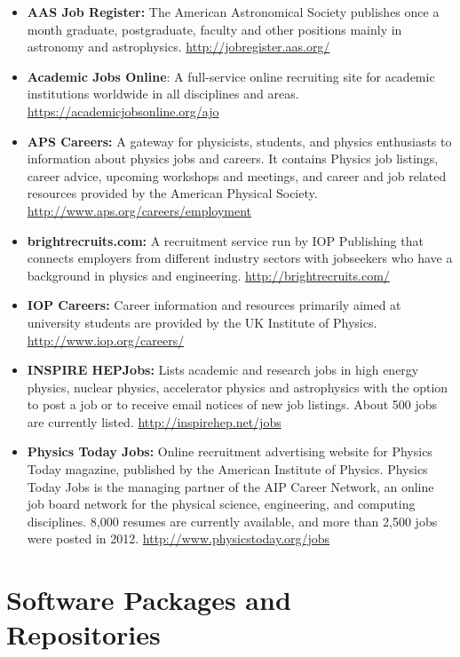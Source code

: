 \begin{itemize}
\item
  \textbf{AAS Job Register:} The American Astronomical Society publishes
  once a month graduate, postgraduate, faculty and other positions
  mainly in astronomy and astrophysics.
  \url{http://jobregister.aas.org/}
\item
  \textbf{Academic Jobs Online}: A full-service online recruiting site
  for academic institutions worldwide in all disciplines and areas.
  \url{https://academicjobsonline.org/ajo}
\item
  \textbf{APS Careers:} A gateway for physicists, students, and physics
  enthusiasts to information about physics jobs and careers. It contains
  Physics job listings, career advice, upcoming workshops and meetings,
  and career and job related resources provided by the American Physical
  Society. \url{http://www.aps.org/careers/employment}
\item
  \textbf{brightrecruits.com:} A recruitment service run by IOP
  Publishing that connects employers from different industry sectors
  with jobseekers who have a background in physics and engineering.
  \url{http://brightrecruits.com/}
\item
  \textbf{IOP Careers:} Career information and resources primarily aimed
  at university students are provided by the UK Institute of Physics.
  \url{http://www.iop.org/careers/}
\item
  \textbf{INSPIRE HEPJobs:} Lists academic and research jobs in high
  energy physics, nuclear physics, accelerator physics and astrophysics
  with the option to post a job or to receive email notices of new job
  listings. About 500 jobs are currently listed.
  \url{http://inspirehep.net/jobs}
\item
  \textbf{Physics Today Jobs:} Online recruitment advertising website
  for Physics Today magazine, published by the American Institute of
  Physics. Physics Today Jobs is the managing partner of the AIP Career
  Network, an online job board network for the physical science,
  engineering, and computing disciplines. 8,000 resumes are currently
  available, and more than 2,500 jobs were posted in 2012.
  \url{http://www.physicstoday.org/jobs}
\end{itemize}

\section{Software Packages and
Repositories}\label{software-packages-and-repositories}

